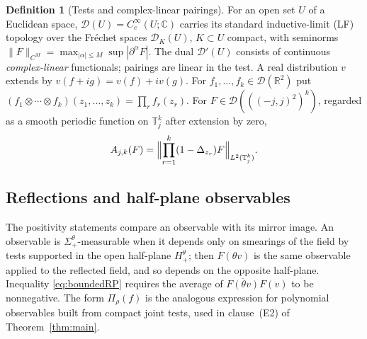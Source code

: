 \documentclass[11pt]{article}
\theoremstyle{plain}
\theoremstyle{definition}
\newtheorem{definition}[theorem]{Definition}
\theoremstyle{remark}
\newcommand{\R}{\mathbb{R}}
\newcommand{\C}{\mathbb{C}}
\newcommand{\T}{\mathbb{T}}
\newcommand{\cD}{\mathcal{D}}
\newcommand{\conj}[1]{\overline{#1}}
\begin{document}
\begin{definition}[Tests and complex-linear pairings]\label{def:tests}
For an open set $U$ of a Euclidean space, $\cD(U)=C_c^{\infty}(U;\C)$ carries
its standard inductive-limit (LF) topology over the Fr\'echet spaces $\cD_K(U)$,
$K\subset U$ compact, with seminorms
$\|F\|_{C^{M}}=\max_{|\alpha|\le M}\sup|\partial^{\alpha}F|$. The dual
$\cD'(U)$ consists of continuous \emph{complex-linear} functionals; pairings are
linear in the test. A real distribution $v$ extends by $v(f+ig)=v(f)+iv(g)$. For
$f_1,\dots,f_k\in\cD(\R^{2})$ put
$(f_1\otimes\cdots\otimes f_k)(z_1,\dots,z_k)=\prod_r f_r(z_r)$. For
$F\in\cD(((-j,j)^{2})^{k})$, regarded as a smooth periodic function on
$\T_j^{k}$ after extension by zero,
\begin{equation}\label{eq:Ajk}
A_{j,k}(F)=\Bigl\|\prod_{r=1}^{k}(1-\Delta_{z_r})F\Bigr\|_{L^{2}(\T_j^{k})}.
\end{equation}
\end{definition}

\subsection{Reflections and half-plane observables}

The positivity statements compare an observable with its mirror image. An observable is $\Sigma^{\theta}_{+}$-measurable when it depends only on smearings of the field by tests supported in the open half-plane $H^{\theta}_{+}$; then $F(\theta v)$ is the same observable applied to the reflected field, and so depends on the opposite half-plane. Inequality \eqref{eq:boundedRP} requires the average of $\conj{F(\theta v)}F(v)$ to be nonnegative. The form $\Pi_\rho(f)$ is the analogous expression for polynomial observables built from compact joint tests, used in clause~(E2) of Theorem~\ref{thm:main}.
\end{document}
